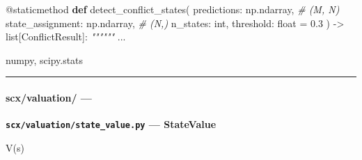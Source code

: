 \documentclass[
  12pt,
]{article}
\newenvironment{Shaded}{}{}
\newcommand{\AttributeTok}[1]{\textcolor[rgb]{0.49,0.56,0.16}{#1}}
\newcommand{\BuiltInTok}[1]{\textcolor[rgb]{0.00,0.50,0.00}{#1}}
\newcommand{\CommentTok}[1]{\textcolor[rgb]{0.38,0.63,0.69}{\textit{#1}}}
\newcommand{\FloatTok}[1]{\textcolor[rgb]{0.25,0.63,0.44}{#1}}
\newcommand{\KeywordTok}[1]{\textcolor[rgb]{0.00,0.44,0.13}{\textbf{#1}}}
\newcommand{\NormalTok}[1]{#1}
\newcommand{\OperatorTok}[1]{\textcolor[rgb]{0.40,0.40,0.40}{#1}}
\begin{document}
\begin{Shaded}
\begin{Highlighting}[]
    \AttributeTok{@staticmethod}
    \KeywordTok{def}\NormalTok{ detect\_conflict\_states(}
\NormalTok{        predictions: np.ndarray,       }\CommentTok{\# (M, N)}
\NormalTok{        state\_assignment: np.ndarray,  }\CommentTok{\# (N,)}
\NormalTok{        n\_states: }\BuiltInTok{int}\NormalTok{,}
\NormalTok{        threshold: }\BuiltInTok{float} \OperatorTok{=} \FloatTok{0.3}
\NormalTok{    ) }\OperatorTok{{-}\textgreater{}} \BuiltInTok{list}\NormalTok{[ConflictResult]:}
        \CommentTok{""""""}
\NormalTok{        ...}
\end{Highlighting}
\end{Shaded}

numpy, scipy.stats

\begin{center}\rule{0.5\linewidth}{0.5pt}\end{center}

\paragraph{scx/valuation/ ---
}\label{scxvaluation-ux6570ux636eux4ef7ux503cux8bc4ux4f30ux6a21ux5757}

\textbf{\texttt{scx/valuation/state\_value.py} --- StateValue}

 V(s) 
\end{document}

